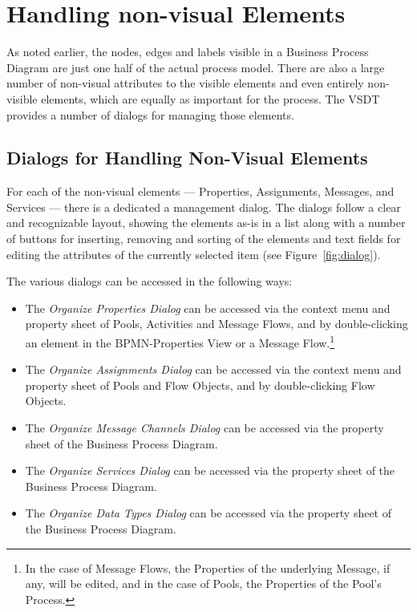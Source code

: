 \section{Handling non-visual Elements}

As noted earlier, the nodes, edges and labels visible in a Business Process
Diagram are just one half of the actual process model.  There are also a large
number of non-visual attributes to the visible elements and even entirely
non-visible elements, which are equally as important for the process.  The VSDT
provides a number of dialogs for managing those elements.



\subsection{Dialogs for Handling Non-Visual Elements}

For each of the non-visual elements --- Properties, Assignments, Messages, and
Services --- there is a dedicated a management dialog.  The dialogs follow a
clear and recognizable layout, showing the elements as-is in a list along with a
number of buttons for inserting, removing and sorting of the elements and text
fields for editing the attributes of the currently selected item (see
Figure~\ref{fig:dialog}).

The various dialogs can be accessed in the following ways:
\begin{itemize}
	\item The \emph{Organize Properties Dialog} can be accessed via the context
	menu and property sheet of Pools, Activities and Message Flows, and by
	double-clicking an element in the BPMN-Properties View or a Message
	Flow.\footnote{In the case of Message Flows, the Properties of the underlying
	Message, if any, will be edited, and in the case of Pools, the Properties of
	the Pool's Process.}
	
	\item The \emph{Organize Assignments Dialog} can be accessed via the context
	menu and property sheet of Pools and Flow Objects, and by double-clicking
	Flow Objects.
	
	\item The \emph{Organize Message Channels Dialog} can be accessed via the
	property sheet of the Business Process Diagram.
	
	\item The \emph{Organize Services Dialog} can be accessed via the property
	sheet of the Business Process Diagram.
	
	\item The \emph{Organize Data Types Dialog} can be accessed via the property
	sheet of the Business Process Diagram.
\end{itemize}

